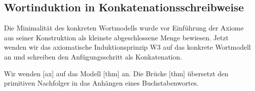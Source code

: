 \subsection{Wortinduktion in Konkatenationsschreibweise}

Die Minimalität des konkreten Wortmodells wurde vor Einführung der Axiome
aus seiner Konstruktion als kleinste abgeschlossene Menge bewiesen.
Jetzt wenden wir das
axiomatische Induktionsprinzip W3 auf das konkrete Wortmodell an
und schreiben den Anfügungsschritt als Konkatenation.

\noindent\begin{minipage}{\linewidth}
\end{minipage}\par
Wir wenden [ax] auf das Modell
[thm] an. Die Brücke
[thm] übersetzt den
primitiven Nachfolger in das Anhängen eines Buchstabenwortes.


